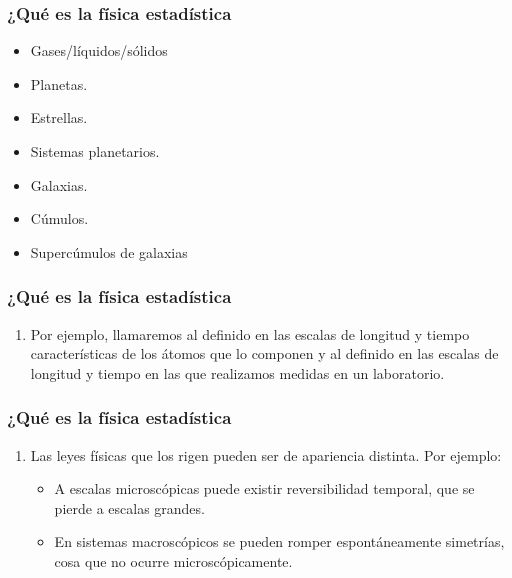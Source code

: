 \documentclass[12pt]{beamer}
\begin{document}
\begin{frame}
\frametitle{¿Qué es la física estadística}
\begin{itemize}[<+->]
\item Gases/líquidos/sólidos
\item Planetas.
\item Estrellas.
\item Sistemas planetarios.
\item Galaxias.
\item Cúmulos.
\item Supercúmulos de galaxias
\end{itemize}
\end{frame}
\begin{frame}
\frametitle{¿Qué es la física estadística}
\begin{enumerate}[<+->]
\conti
\item Por ejemplo,  \pause llamaremos  \pause al definido en las escalas de longitud y tiempo características de los átomos que lo componen \pause y  al definido en las escalas de longitud y tiempo en las que realizamos medidas en un laboratorio.
\seti
\end{enumerate}
\end{frame}
\begin{frame}
\frametitle{¿Qué es la física estadística}
\begin{enumerate}[<+->]
\conti
\item Las leyes físicas que los rigen pueden ser de apariencia distinta. \pause Por ejemplo:
\begin{itemize}
\item A escalas microscópicas puede existir reversibilidad temporal, que se pierde a escalas grandes.
\item En sistemas macroscópicos se pueden romper espontáneamente simetrías, cosa que no ocurre microscópicamente.
\end{itemize}
\seti
\end{enumerate}
\end{frame}
\end{document}
